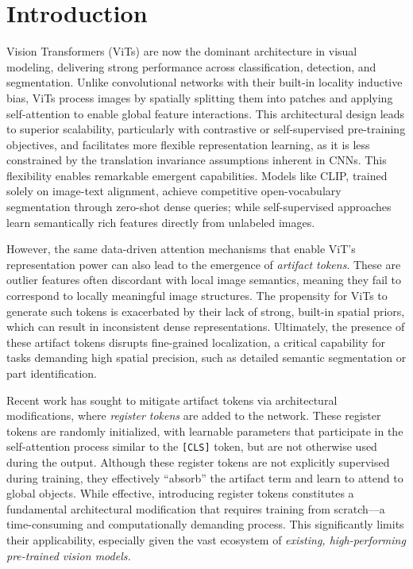 \vspace{-.1cm}
\section{Introduction}
\vspace{-.1cm}

Vision Transformers (ViTs) are now the dominant architecture in visual modeling, delivering strong performance across classification, detection, and segmentation. Unlike convolutional networks with their built-in locality inductive bias, ViTs process images by spatially splitting them into patches and applying self-attention to enable global feature interactions. This architectural design leads to superior scalability, particularly with contrastive or self-supervised pre-training objectives, and facilitates more flexible representation learning, as it is less constrained by the translation invariance assumptions inherent in CNNs. This flexibility enables remarkable emergent capabilities. Models like CLIP, trained solely on image-text alignment, achieve competitive open-vocabulary segmentation through zero-shot dense queries; while self-supervised approaches learn semantically rich features directly from unlabeled images. 

However, the same data-driven attention mechanisms that enable ViT's representation power can also lead to the emergence of \emph{artifact tokens}. These are outlier features often discordant with local image semantics, meaning they fail to correspond to locally meaningful image structures. The propensity for ViTs to generate such tokens is exacerbated by their lack of strong, built-in spatial priors, which can result in inconsistent dense representations. Ultimately, the presence of these artifact tokens disrupts fine-grained localization, a critical capability for tasks demanding high spatial precision, such as detailed semantic segmentation or part identification.

Recent work has sought to mitigate artifact tokens via architectural modifications, where \textit{register tokens} are added to the network. These register tokens are randomly initialized, with learnable parameters that participate in the self-attention process similar to the \texttt{[CLS]} token, but are not otherwise used during the output. Although these register tokens are not explicitly supervised during training, they effectively ``absorb'' the artifact term and learn to attend to global objects. While effective, introducing register tokens constitutes a fundamental architectural modification that requires training from scratch---a time-consuming and computationally demanding process. This significantly limits their applicability, especially given the vast ecosystem of \emph{existing, high-performing pre-trained vision models.} 

